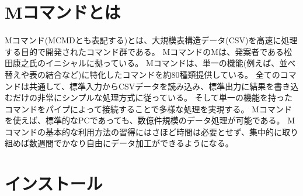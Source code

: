 
%

\section{Mコマンドとは\label{sect:whatis}}
Mコマンド(MCMDとも表記する)とは、大規模表構造データ(CSV)を高速に処理する目的で開発されたコマンド群である。
MコマンドのMは、発案者である松田康之氏のイニシャルに拠っている。
Mコマンドは、単一の機能(例えば、並べ替えや表の結合など)に特化したコマンドを約80種類提供している。
全てのコマンドは共通して、標準入力からCSVデータを読み込み、標準出力に結果を書き込むだけの非常にシンプルな処理方式に従っている。
そして単一の機能を持ったコマンドをパイプによって接続することで多様な処理を実現する。
Mコマンドを使えば、標準的なPCであっても、数億件規模のデータ処理が可能である。
Mコマンドの基本的な利用方法の習得にはさほど時間は必要とせず、集中的に取り組めば数週間でかなり自由にデータ加工ができるようになる。



\newpage
\section{インストール\label{sect:install}}
